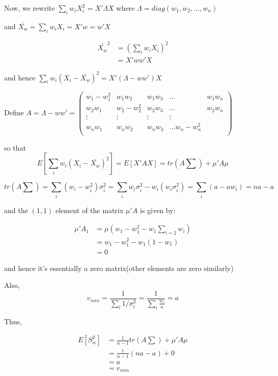 \documentclass[a4paper]{article}
\begin{document}
Now, we rewrite $\sum_i w_iX_i^2 = X'\Lambda X$ where $\Lambda = diag(w_1, w_2, \dots, w_n)$

and $\bar{X_w} = \sum_i w_iX_i = X'w = w'X$

\begin{align*}
\bar{X_w}^2 &= (\sum_i w_iX_i)^2\\
&=X'ww'X
\end{align*}

and hence $\sum_i w_i (X_i-\bar{X_w})^2=X'(\Lambda-ww')X$ 

Define $A=\Lambda-ww' = \begin{pmatrix}
w_1-w_1^2 & w_1w_2 & w_1w_3 & \dots & w_1w_n\\
w_2w_1 & w_2-w_2^2 & w_2w_3 & \dots & w_2w_n\\
\vdots & \vdots & \vdots & \vdots \\
w_nw_1 & w_nw_2 & w_nw_3 & \dots w_n-w_n^2\\
\end{pmatrix}$

so that 
$$E[\sum_i w_i (X_i-\bar{X_w})^2] = E[X'AX]= tr(A\sum) + \mu'A\mu$$


$$tr(A\sum) = \sum_i(w_i-w_i^2)\sigma_i^2 = \sum_i w_i\sigma_i^2-w_i(w_i\sigma_i^2) = \sum_i (a-aw_i) = na-a$$

and the $(1,1)$ element of the matrix $\mu'A$ is given by: 

\begin{align*}
\mu'A_1 &= \mu (w_1-w_1^2 - w_1\sum_{i=2}w_i)\\ &= w_1-w_1^2-w_1(1-w_1)\\ 
&= 0\end{align*}

and hence it's essentially a zero matrix(other elements are zero similarly)

Also, $$v_{min} = \frac{1}{\sum_i 1/\sigma_i^2} = \frac{1}{\sum_i \frac{w_i}{a}} = a$$

Thus,

\begin{align*}
E[S_w^2] &= \frac{1}{n-1} tr(A\sum) + \mu'A\mu\\
&= \frac{1}{n-1} (na-a) + 0\\
&=a\\
&= v_{min}
\end{align*}
\end{document}
